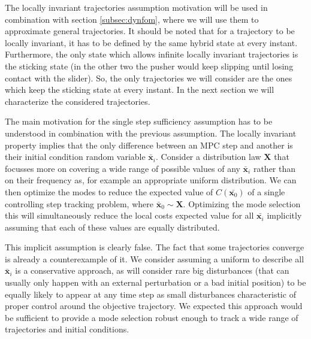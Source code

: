 \documentclass[12,twoside]{TFG-GM}
\theoremstyle{definition}
\theoremstyle{remark}
\newcommand*\diff[1]{\bar{#1}}
\begin{document}
The locally invariant trajectories assumption motivation will be used in combination with section \ref{subsec:dynfom}, where we will use them to approximate general trajectories. It should be noted that for a trajectory to be locally invariant, it has to be defined by the same hybrid state at every instant. Furthermore, the only state which allows infinite locally invariant trajectories is the sticking state (in the other two the pusher would keep slipping until losing contact with the slider). So, the only trajectories we will consider are the ones which keep the sticking state at every instant. In the next section we will characterize the considered trajectories.

The main motivation for the single step sufficiency assumption has to be understood in combination with the previous assumption. The locally invariant property implies that the only difference between an MPC step and another is their initial condition random variable $\diff{\textbf{x}}_i$. Consider a distribution law $\textbf{X}$ that focusses more on covering a wide range of possible values of any $\diff{\textbf{x}}_i$ rather than on their frequency as, for example an appropriate uniform distribution. We can then optimize the modes to reduce the expected value of $C(\diff{\textbf{x}_0})$ of a single controlling step tracking problem, where $\diff{\textbf{x}}_0 \sim \textbf{X}$. Optimizing the mode selection this will simultaneously reduce the local costs expected value for all $\diff{\textbf{x}_i}$ implicitly assuming that each of these values are equally distributed.

This implicit assumption is clearly false. The fact that some trajectories converge is already a counterexample of it. We consider assuming a uniform to describe all $\diff{\textbf{x}}_i$ is a conservative approach, as will consider rare big disturbances (that can usually only happen with an external perturbation or a bad initial position) to be equally likely to appear at any time step as small disturbances characteristic of proper control around the objective trajectory. We expected this approach would be sufficient to provide a mode selection robust enough to track a wide range of trajectories and initial conditions.
\end{document}
